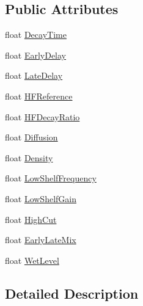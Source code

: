 \subsection*{Public Attributes}
\begin{DoxyCompactItemize}
\item 
float \hyperlink{struct_f_m_o_d_1_1_r_e_v_e_r_b___p_r_o_p_e_r_t_i_e_s_a31e780e8618561ab7f8788f13cae9ad9}{Decay\+Time}
\item 
float \hyperlink{struct_f_m_o_d_1_1_r_e_v_e_r_b___p_r_o_p_e_r_t_i_e_s_a1a06a6a047ec42eef7a9836c569f098e}{Early\+Delay}
\item 
float \hyperlink{struct_f_m_o_d_1_1_r_e_v_e_r_b___p_r_o_p_e_r_t_i_e_s_aaaa6e9a2d9a7c9f7d43f5abf7c0281bc}{Late\+Delay}
\item 
float \hyperlink{struct_f_m_o_d_1_1_r_e_v_e_r_b___p_r_o_p_e_r_t_i_e_s_ad42f6b3324dc8af158ab52fb0aaa8e5d}{H\+F\+Reference}
\item 
float \hyperlink{struct_f_m_o_d_1_1_r_e_v_e_r_b___p_r_o_p_e_r_t_i_e_s_a61ca9bda11e49d65e76d862b3d310603}{H\+F\+Decay\+Ratio}
\item 
float \hyperlink{struct_f_m_o_d_1_1_r_e_v_e_r_b___p_r_o_p_e_r_t_i_e_s_afdc5b20b438ff04c9d558a571bd159d1}{Diffusion}
\item 
float \hyperlink{struct_f_m_o_d_1_1_r_e_v_e_r_b___p_r_o_p_e_r_t_i_e_s_aff2c7b17b3e415055ef25e71d56020a8}{Density}
\item 
float \hyperlink{struct_f_m_o_d_1_1_r_e_v_e_r_b___p_r_o_p_e_r_t_i_e_s_a833291bb7cf84e0726aaff2659a00f3d}{Low\+Shelf\+Frequency}
\item 
float \hyperlink{struct_f_m_o_d_1_1_r_e_v_e_r_b___p_r_o_p_e_r_t_i_e_s_aee7b29f5b5dc1d207c38becb8a1d378b}{Low\+Shelf\+Gain}
\item 
float \hyperlink{struct_f_m_o_d_1_1_r_e_v_e_r_b___p_r_o_p_e_r_t_i_e_s_a7c840366dd9f9a2a425929bc50123b74}{High\+Cut}
\item 
float \hyperlink{struct_f_m_o_d_1_1_r_e_v_e_r_b___p_r_o_p_e_r_t_i_e_s_a5d9e631428ed6cd0e9c1df75338181c7}{Early\+Late\+Mix}
\item 
float \hyperlink{struct_f_m_o_d_1_1_r_e_v_e_r_b___p_r_o_p_e_r_t_i_e_s_ab52952f37ab74a931bf1df7f75c1a064}{Wet\+Level}
\end{DoxyCompactItemize}


\subsection{Detailed Description}


